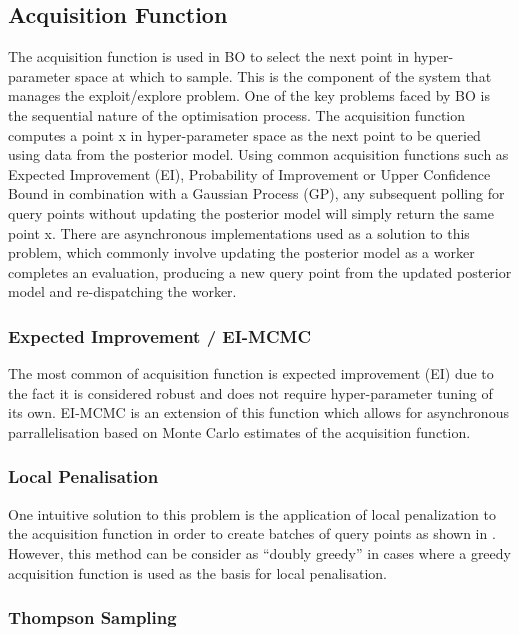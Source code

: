 \documentclass{article}
\begin{document}
\subsection {Acquisition Function}

The acquisition function is used in BO to select the next point in hyper-parameter space at which to sample. This is the component of the system that manages the exploit/explore problem. One of the key problems faced by BO is the sequential nature of the optimisation process. The acquisition function computes a point x in hyper-parameter space as the next point to be queried using data from the posterior model. Using common acquisition functions such as Expected Improvement (EI), Probability of Improvement or Upper Confidence Bound in combination with a Gaussian Process (GP), any subsequent polling for query points without updating the posterior model will simply return the same point x.
There are asynchronous implementations used as a solution to this problem, which commonly involve updating the posterior model as a worker completes an evaluation, producing a new query point from the updated posterior model and re-dispatching the worker. \cite{26}\cite{27}\cite{20}

\subsubsection{Expected Improvement / EI-MCMC}

The most common of acquisition function is expected improvement (EI) due to the fact it is considered robust and does not require hyper-parameter tuning of its own. \cite{17} EI-MCMC is an extension of this function which allows for asynchronous parrallelisation based on Monte Carlo estimates of the acquisition function.


\subsubsection{Local Penalisation}

One intuitive solution to this problem is the application of local penalization to the acquisition function in order to create batches of query points as shown in \cite{37}. However, this method can be consider as “doubly greedy” \cite{36} in cases where a greedy acquisition function is used as the basis for local penalisation.

\subsubsection{Thompson Sampling}
\end{document}
